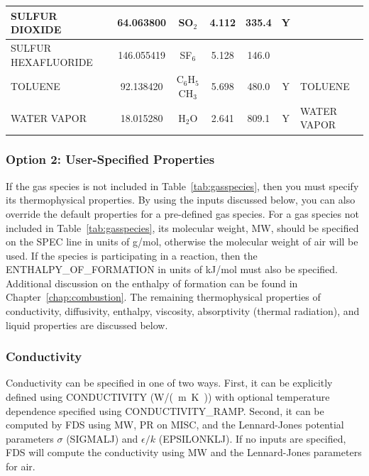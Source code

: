 \documentclass[11pt]{book}
\begin{document}
\begin{longtable}{@{\extracolsep{\fill}}|l|c|c|c|c|c|l|}
{\ct SULFUR DIOXIDE}     & 64.063800  & SO$_2$           & 4.112    & 335.4    &  Y       &                            \\ \hline
{\ct SULFUR HEXAFLUORIDE}& 146.055419 & SF$_6$           & 5.128    & 146.0    &          &                            \\ \hline
{\ct TOLUENE}            & 92.138420  & C$_6$H$_5$CH$_3$ & 5.698    & 480.0    &  Y       &  {\ct TOLUENE}             \\ \hline
{\ct WATER VAPOR}        & 18.015280  & H$_2$O           & 2.641    & 809.1    &  Y       &  {\ct WATER VAPOR}         \\ \hline
\end{longtable}


\subsubsection{Option 2: User-Specified Properties}

If the gas species is not included in Table~\ref{tab:gasspecies}, then you must specify its thermophysical properties.  By using the inputs discussed below, you can also override the default properties for a pre-defined gas species.  For a gas species not included in Table~\ref{tab:gasspecies}, its molecular weight, {\ct MW}, should be specified on the {\ct SPEC} line in units of g/mol, otherwise the molecular weight of air will be used.  If the species is participating in a reaction, then the {\ct ENTHALPY\_OF\_FORMATION} in units of kJ/mol must also be specified. Additional discussion on the enthalpy of formation can be found in Chapter~\ref{chap:combustion}.  The remaining thermophysical properties of conductivity, diffusivity, enthalpy, viscosity, absorptivity (thermal radiation), and liquid properties are discussed below.

\subsubsection{Conductivity}

Conductivity can be specified in one of two ways.  First, it can be explicitly defined using {\ct CONDUCTIVITY} (\si{W/(m.K)}) with optional temperature dependence specified using {\ct CONDUCTIVITY\_RAMP}.  Second, it can be computed by FDS using {\ct MW}, {\ct PR} on {\ct MISC}, and the Lennard-Jones potential parameters $\sigma$ ({\ct SIGMALJ}) and $\epsilon/k$ ({\ct EPSILONKLJ}).  If no inputs are specified, FDS will compute the conductivity using {\ct MW} and the Lennard-Jones parameters for air.
\end{document}
